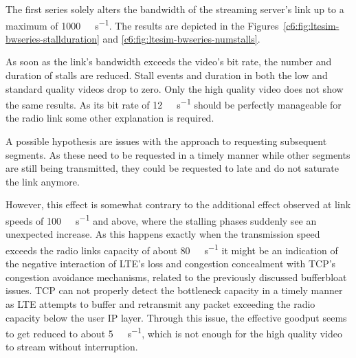 The first series solely alters the bandwidth of the streaming server's link up to a maximum of \SI{1000}{\mega\bit\per\second}. The results are depicted in the Figures~\ref{c6:fig:ltesim-bwseries-stallduration} and \ref{c6:fig:ltesim-bwseries-numstalls}.

As soon as the link's bandwidth exceeds the video's bit rate, the number and duration of stalls are reduced. Stall events and duration in both the low and standard quality videos drop to zero. Only the high quality video does not show the same results. As its bit rate of \SI{12}{\mega\bit\per\second} should be perfectly manageable for the radio link some other explanation is required. 

A possible hypothesis are issues with the approach to requesting subsequent segments. As these need to be requested in a timely manner while other segments are still being transmitted, they could be requested to late and do not saturate the link anymore. 

However, this effect is somewhat contrary to the additional effect observed at link speeds of \SI{100}{\mega\bit\per\second} and above, where the stalling phases suddenly see an unexpected increase. As this happens exactly when the transmission speed exceeds the radio links capacity of about \SI{80}{\mega\bit\per\second} it might be an indication of the negative interaction of \gls{LTE}'s loss and congestion concealment with \gls{TCP}'s congestion avoidance mechanisms, related to the previously discussed bufferbloat issues. \gls{TCP} can not properly detect the bottleneck capacity in a timely manner as \gls{LTE} attempts to buffer and retransmit any packet exceeding the radio capacity below the user \gls{IP} layer. Through this issue, the effective goodput seems to get reduced to about \SI{5}{\mega\bit\per\second}, which is not enough for the high quality video to stream without interruption.


